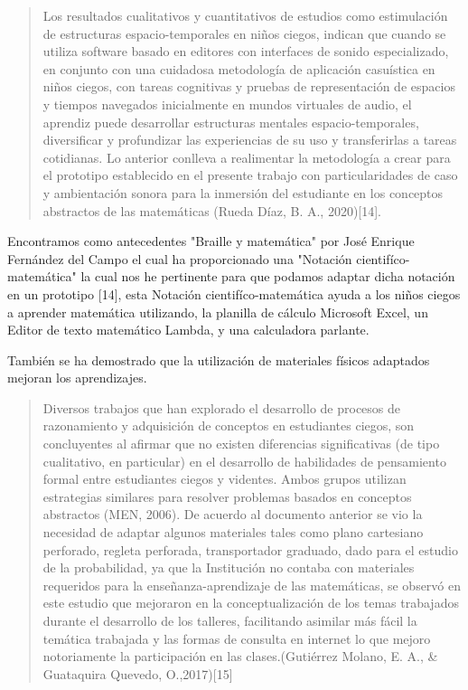 \documentclass{article}
\begin{document}
\begin{quote}
{\changefontsizes{8.8pt}
Los resultados cualitativos y cuantitativos de estudios como estimulación de estructuras espacio-temporales en niños ciegos, indican que cuando se utiliza software basado en editores con interfaces de sonido especializado, en conjunto con una cuidadosa metodología de aplicación casuística en niños ciegos, con tareas cognitivas y pruebas de representación de espacios y tiempos navegados inicialmente en mundos virtuales de audio, el aprendiz puede desarrollar estructuras mentales espacio-temporales, diversificar y profundizar las experiencias de su uso y transferirlas a tareas cotidianas. Lo anterior conlleva a realimentar la metodología a crear para el prototipo establecido en el presente trabajo con particularidades de caso y ambientación sonora para la inmersión del estudiante en los conceptos abstractos de las matemáticas (Rueda Díaz, B. A., 2020)[14].
}
\end{quote}

{\changefontsizes{8.8pt}
Encontramos como antecedentes "Braille y matemática" por José Enrique Fernández del Campo el cual ha proporcionado una "Notación cientifíco-matemática" la cual nos he pertinente para que podamos adaptar dicha notación en un prototipo [14], esta Notación cientifíco-matemática ayuda a los niños ciegos a aprender matemática utilizando, la planilla de cálculo Microsoft Excel, un Editor de texto matemático Lambda, y una calculadora parlante.

También se ha demostrado que la utilización de materiales físicos adaptados mejoran los aprendizajes.
}

\begin{quote}
{\changefontsizes{8.8pt}	
Diversos  trabajos  que  han  explorado  el  desarrollo  de  procesos  de  razonamiento  y adquisición  de  conceptos  en  estudiantes  ciegos,  son  concluyentes  al  afirmar  que  no  existen diferencias  significativas  (de  tipo  cualitativo,  en  particular)  en  el desarrollo  de  habilidades  de pensamiento  formal  entre  estudiantes  ciegos  y  videntes.  Ambos  grupos  utilizan  estrategias  similares para resolver problemas basados en conceptos abstractos (MEN, 2006). De acuerdo al documento anterior se vio la necesidad de adaptar algunos materiales tales como plano cartesiano perforado, regleta perforada, transportador graduado, dado para el estudio de la probabilidad, ya que la Institución no contaba con materiales requeridos para la enseñanza-aprendizaje de las matemáticas, se observó en este estudio que mejoraron en la conceptualización  de  los  temas  trabajados  durante  el  desarrollo  de  los  talleres,  facilitando  asimilar  más  fácil  la temática   trabajada   y   las   formas   de   consulta   en   internet   lo   que  mejoro   notoriamente   la participación en las clases.(Gutiérrez Molano, E. A., \& Guataquira Quevedo, O.,2017)[15]	
}
\end{quote}
\end{document}
